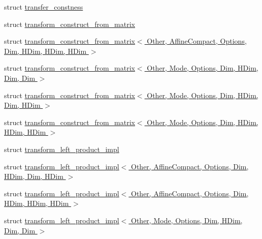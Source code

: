 \begin{DoxyCompactItemize}
\item 
struct \hyperlink{struct_eigen_1_1internal_1_1transfer__constness}{transfer\+\_\+constness}
\item 
struct \hyperlink{struct_eigen_1_1internal_1_1transform__construct__from__matrix}{transform\+\_\+construct\+\_\+from\+\_\+matrix}
\item 
struct \hyperlink{struct_eigen_1_1internal_1_1transform__construct__from__matrix_3_01_other_00_01_affine_compact_0db5fc8047dca3fa661370cba4245d7ad}{transform\+\_\+construct\+\_\+from\+\_\+matrix$<$ Other, Affine\+Compact, Options, Dim, H\+Dim, H\+Dim, H\+Dim $>$}
\item 
struct \hyperlink{struct_eigen_1_1internal_1_1transform__construct__from__matrix_3_01_other_00_01_mode_00_01_optio6dcff4dd79db682c85f7e1f5d15fb563}{transform\+\_\+construct\+\_\+from\+\_\+matrix$<$ Other, Mode, Options, Dim, H\+Dim, Dim, Dim $>$}
\item 
struct \hyperlink{struct_eigen_1_1internal_1_1transform__construct__from__matrix_3_01_other_00_01_mode_00_01_optio2861b11cb783feb790ab70300c43bf0a}{transform\+\_\+construct\+\_\+from\+\_\+matrix$<$ Other, Mode, Options, Dim, H\+Dim, Dim, H\+Dim $>$}
\item 
struct \hyperlink{struct_eigen_1_1internal_1_1transform__construct__from__matrix_3_01_other_00_01_mode_00_01_optioafd8e88ef382fcf70f7e3dd5fcd9f415}{transform\+\_\+construct\+\_\+from\+\_\+matrix$<$ Other, Mode, Options, Dim, H\+Dim, H\+Dim, H\+Dim $>$}
\item 
struct \hyperlink{struct_eigen_1_1internal_1_1transform__left__product__impl}{transform\+\_\+left\+\_\+product\+\_\+impl}
\item 
struct \hyperlink{struct_eigen_1_1internal_1_1transform__left__product__impl_3_01_other_00_01_affine_compact_00_015e9b9427c7ea1ff34d05c5964520dbab}{transform\+\_\+left\+\_\+product\+\_\+impl$<$ Other, Affine\+Compact, Options, Dim, H\+Dim, Dim, H\+Dim $>$}
\item 
struct \hyperlink{struct_eigen_1_1internal_1_1transform__left__product__impl_3_01_other_00_01_affine_compact_00_01ed09886be52acac174d30c2c7403587b}{transform\+\_\+left\+\_\+product\+\_\+impl$<$ Other, Affine\+Compact, Options, Dim, H\+Dim, H\+Dim, H\+Dim $>$}
\item 
struct \hyperlink{struct_eigen_1_1internal_1_1transform__left__product__impl_3_01_other_00_01_mode_00_01_options_0b0d1bc6bb0265d07cac191ec3dc368a3}{transform\+\_\+left\+\_\+product\+\_\+impl$<$ Other, Mode, Options, Dim, H\+Dim, Dim, Dim $>$}
\item 

\end{DoxyCompactItemize}
